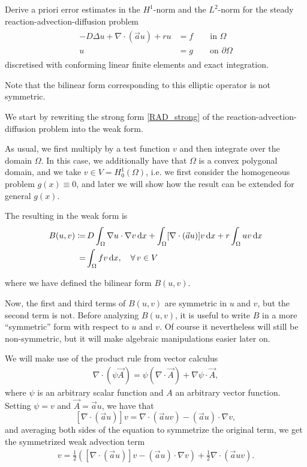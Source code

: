 Derive a priori error estimates in the $H^1$-norm and the $L^2$-norm for the steady reaction-advection-diffusion problem
\begin{align}\label{RAD_strong}
\begin{split}
-D\Delta u + \nabla \cdot (\vec{a}u) + ru &= f \qquad \text{in } \Omega\\
u &= g  \qquad \text{on } \partial\Omega
\end{split}
\end{align}
discretised with conforming linear finite elements and exact integration.

Note that the bilinear form corresponding to this elliptic operator is not symmetric.

\begin{solution}

We start by rewriting the strong form \eqref{RAD_strong} of the reaction-advection-diffusion problem into the weak form.

As usual, we first multiply by a test function $v$ and then integrate over the domain $\Omega$.
In this case, we additionally have that $\Omega$ is a convex polygonal domain, and we take $v \in V = H^1_0(\Omega)$, i.e. we first consider the homogeneous problem $g(x) \equiv 0$, and later we will show how the result can be extended for general $g(x)$.

\newpage
The resulting in the weak form is
\begin{align}\label{RAD_weak1}
\begin{split}
	B(u,v) \coloneqq& \,
    D \int_\Omega \nabla u \cdot \nabla v \operatorname{d}\!{x} + 
      \int_\Omega [\nabla \cdot (\vec{a} u)] v \operatorname{d}\!{x} + 
    r \int_\Omega u v \operatorname{d}\!{x} \\
    =& \int_\Omega f v \operatorname{d}\!{x}, \quad \forall \, v \in V
\end{split}
\end{align}

where we have defined the bilinear form $B(u,v)$.

Now, the first and third terms of $B(u,v)$ are symmetric in $u$ and $v$, but the second term is not.
Before analyzing $B(u,v)$, it is useful to write $B$ in a more ``symmetric'' form with respect to $u$ and $v$.
Of course it nevertheless will still be non-symmetric, but it will make algebraic manipulations easier later on.

We will make use of the product rule from vector calculus
\begin{align}\label{vecProdRule}
\nabla \cdot (\psi \vec{A}) = \psi (\nabla \cdot \vec{A}) + \nabla \psi \cdot \vec{A},
\end{align}
where $\psi$ is an arbitrary scalar function and $A$ an arbitrary vector function.
Setting $\psi = v$ and $\vec{A} = \vec{a}u$, we have that
$$ [\nabla \cdot (\vec{a}u)] v
= \nabla \cdot (\vec{a} uv) - (\vec{a} u) \cdot \nabla v,$$
and averaging both sides of the equation to symmetrize the original term, we get the symmetrized weak advection term
\begin{align*}
[\nabla \cdot (\vec{a}u)] v
= \frac{1}{2} \left( [\nabla \cdot (\vec{a}u)] v - (\vec{a} u) \cdot \nabla v \right)+ 
\frac{1}{2} \nabla \cdot (\vec{a} uv).
\end{align*}


\end{solution}
